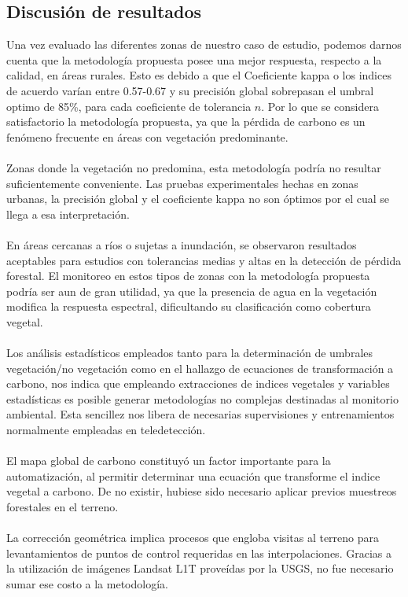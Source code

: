 \subsection{Discusi\'on de resultados}
Una vez evaluado las diferentes zonas de nuestro caso de estudio, podemos darnos cuenta que la metodolog\'ia propuesta posee una mejor respuesta, respecto a la calidad, en \'areas rurales. Esto es debido a que el Coeficiente kappa o los indices de acuerdo var\'ian entre 0.57-0.67 y su precisi\'on global sobrepasan el umbral optimo de 85\%, para cada coeficiente de tolerancia $ n $. Por lo que se considera satisfactorio la metodolog\'ia propuesta, ya que la p\'erdida de carbono es un fen\'omeno frecuente en \'areas con vegetaci\'on predominante.\\~\\	
Zonas donde la vegetaci\'on no predomina, esta metodolog\'ia podr\'ia no resultar suficientemente conveniente. Las pruebas experimentales hechas en zonas urbanas, la precisi\'on global y el coeficiente kappa no son \'optimos por el cual se llega a esa interpretaci\'on.\\~\\
 En \'areas cercanas a r\'ios o sujetas a inundaci\'on, se observaron resultados aceptables para  estudios con tolerancias medias y altas en la detecci\'on de p\'erdida forestal. El monitoreo en estos tipos de zonas con la metodolog\'ia propuesta podr\'ia ser aun de gran utilidad, ya que la presencia de agua en la vegetaci\'on modifica la respuesta espectral, dificultando su clasificaci\'on como cobertura vegetal.\\~\\	
 Los an\'alisis estad\'isticos empleados tanto para la determinaci\'on de umbrales vegetaci\'on/no vegetaci\'on como en el hallazgo de ecuaciones de transformaci\'on a carbono, nos indica que empleando extracciones de indices vegetales y variables estad\'isticas es posible generar metodolog\'ias no complejas destinadas al monitorio ambiental. Esta sencillez nos libera de necesarias supervisiones y entrenamientos normalmente empleadas en teledetecci\'on.\\~\\	
El mapa global de carbono \cite{saatchi2011benchmark} constituy\'o un factor importante para la automatizaci\'on, al permitir determinar una ecuaci\'on que transforme el indice vegetal a carbono. De no existir, hubiese sido necesario aplicar previos muestreos forestales en el terreno.\\~\\	
 La correcci\'on geom\'etrica implica procesos que engloba visitas al terreno para levantamientos de puntos de control requeridas en las interpolaciones. Gracias a la utilizaci\'on de im\'agenes Landsat L1T prove\'idas por la USGS, no fue necesario sumar ese costo a la metodolog\'ia.
